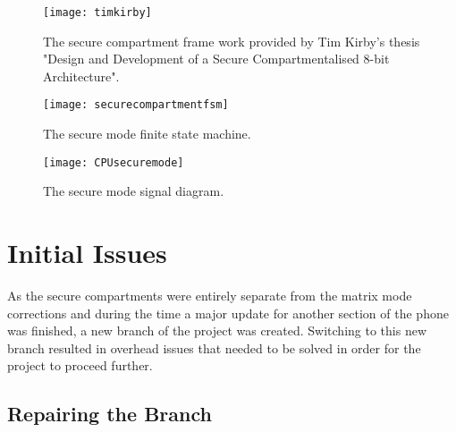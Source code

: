 \begin{figure}
  \centering
  \texttt{[image: timkirby]}
  \caption{The secure compartment frame work provided by Tim Kirby's thesis "Design and Development of a Secure Compartmentalised 8-bit Architecture".}
  \label{fig:timkirby}
\end{figure}

\begin{figure}
  \centering
  \texttt{[image: securecompartmentfsm]}
  \caption{The secure mode finite state machine.}
  \label{fig:securecompartmentsfsm}
\end{figure}

\begin{figure}
  \centering
  \texttt{[image: CPUsecuremode]}
  \caption{The secure mode signal diagram.}
  \label{fig:CPUsecuremode}
\end{figure}


\section{Initial Issues}

\label{Ch6 Sec2}

As the secure compartments were entirely separate from the matrix mode corrections and during the time a major update for another section of the phone was finished, a new branch of the project was created. Switching to this new branch resulted in overhead issues that needed to be solved in order for the project to proceed further.

\subsection{Repairing the Branch}

\label{Ch6 Sec2 Sub1}

